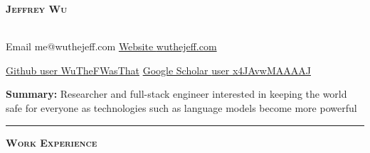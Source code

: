 \documentclass[11 pt]{article}
\begin{document}
\begin{center}
\begin{LARGE}\textsc{\textbf{Jeffrey Wu}}\end{LARGE} \\
Email {\tiny me@wuthejeff.com} \hfill
\href{http://wuthejeff.com}{Website {\tiny wuthejeff.com}}


\href{https://github.com/WuTheFWasThat}{Github {\tiny user WuTheFWasThat}}  \hfill \href{https://scholar.google.com/citations?user=x4JAvwMAAAAJ}{Google Scholar {\tiny user x4JAvwMAAAAJ}}\\
\end{center}

\noindent \textbf{Summary:}
Researcher and full-stack engineer
interested in keeping the world safe for everyone as technologies such as language models become more powerful \\





\hrule


\begin{center}\begin{Large}\textsc{\textbf{Work Experience}\\}\end{Large}\end{center}
\end{document}
